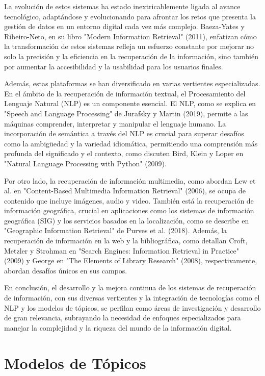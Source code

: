 La evolución de estos sistemas ha estado inextricablemente ligada al avance tecnológico, adaptándose y evolucionando para afrontar los retos que presenta la gestión de datos en un entorno digital cada vez más complejo. Baeza-Yates y Ribeiro-Neto, en su libro "Modern Information Retrieval" (2011), enfatizan cómo la transformación de estos sistemas refleja un esfuerzo constante por mejorar no solo la precisión y la eficiencia en la recuperación de la información, sino también por aumentar la accesibilidad y la usabilidad para los usuarios finales.

Además, estas plataformas se han diversificado en varias vertientes especializadas. En el ámbito de la recuperación de información textual, el Procesamiento del Lenguaje Natural (NLP) es un componente esencial. El NLP, como se explica en "Speech and Language Processing" de Jurafsky y Martin (2019), permite a las máquinas comprender, interpretar y manipular el lenguaje humano. La incorporación de semántica a través del NLP es crucial para superar desafíos como la ambigüedad y la variedad idiomática, permitiendo una comprensión más profunda del significado y el contexto, como discuten Bird, Klein y Loper en "Natural Language Processing with Python" (2009).

Por otro lado, la recuperación de información multimedia, como abordan Lew et al. en "Content-Based Multimedia Information Retrieval" (2006), se ocupa de contenido que incluye imágenes, audio y video. También está la recuperación de información geográfica, crucial en aplicaciones como los sistemas de información geográfica (SIG) y los servicios basados en la localización, como se describe en "Geographic Information Retrieval" de Purves et al. (2018). Además, la recuperación de información en la web y la bibliográfica, como detallan Croft, Metzler y Strohman en "Search Engines: Information Retrieval in Practice" (2009) y George en "The Elements of Library Research" (2008), respectivamente, abordan desafíos únicos en sus campos.

En conclusión, el desarrollo y la mejora continua de los sistemas de recuperación de información, con sus diversas vertientes y la integración de tecnologías como el NLP y los modelos de tópicos, se perfilan como áreas de investigación y desarrollo de gran relevancia, subrayando la necesidad de enfoques especializados para manejar la complejidad y la riqueza del mundo de la información digital.

\section{Modelos de T\'opicos}

